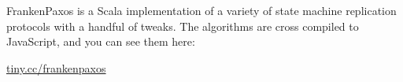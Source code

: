 FrankenPaxos is a Scala implementation of a variety of state machine
replication protocols with a handful of tweaks. The algorithms are cross
compiled to JavaScript, and you can see them here:

\begin{center}
  \Huge
  \url{tiny.cc/frankenpaxos}
\end{center}
